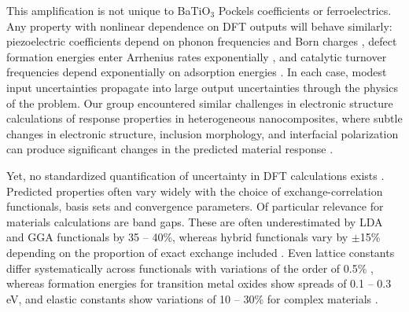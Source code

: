 \documentclass[twocolumn,superscriptaddress,amsmath,amssymb,longbibliography]{revtex4-2}
\begin{document}
This amplification is not unique to BaTiO$_3$ Pockels coefficients or ferroelectrics. Any property
with nonlinear dependence on DFT outputs will behave similarly: piezoelectric coefficients depend on phonon frequencies and Born
charges \cite{Wu2005_piezo}, defect formation energies enter
Arrhenius rates exponentially \cite{Freysoldt2014}, and catalytic
turnover frequencies depend exponentially on adsorption energies
\cite{Norskov2004,Medford2015}. In each case, modest input uncertainties
propagate into large output uncertainties through the physics of the problem. Our group encountered similar challenges in electronic structure calculations of response properties in heterogeneous nanocomposites, where subtle changes in electronic structure, inclusion morphology, and interfacial polarization can produce significant changes in the predicted material response \cite{Rowan2011,Henderson2023}.

Yet, no standardized quantification of uncertainty in DFT calculations exists \cite{Burke2012}. Predicted properties often vary widely with the choice of exchange-correlation functionals, basis sets and convergence parameters. Of particular relevance for materials calculations are band gaps. These are often underestimated by LDA and GGA functionals by
35 -- 40\%, whereas hybrid functionals vary by $\pm$15\%
depending on the proportion of exact exchange included \cite{Borlido2019,Heyd2003_HSE}.  Even lattice constants differ systematically across functionals with variations of the order of 0.5\%
\cite{Lejaeghere2016,Haas2009}, whereas formation energies for transition metal oxides show spreads of 0.1 -- 0.3 eV\cite{Kingsbury2022,Stevanovic2012_FERE}, and elastic constants show variations of 10 -- 30\%  for complex materials
\cite{deJong2015}.
\end{document}
